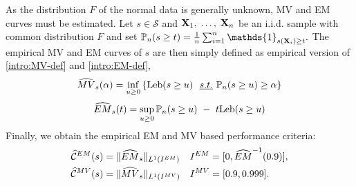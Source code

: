 As the distribution $F$ of the normal data is generally unknown, MV and EM curves must be estimated. Let $s\in \mathcal{S}$ and $\mathbf X_1,\; \ldots,\; \mathbf X_n$ be an i.i.d. sample with common distribution $F$ and set $\mathbb{P}_n(s \ge t)=\frac{1}{n}\sum_{i=1}^n\mathds{1}_{s(\mb X_i)\geq t}.$ The empirical MV and EM curves of $s$ are then simply defined as empirical version of \eqref{intro:MV-def} and \eqref{intro:EM-def}, 
\begin{align}
\label{MV-def-emp}
\widehat{MV}_s(\alpha) = \inf_{u \ge 0} \left\{ \text{Leb}(s \ge u) ~~\emph{s.t.}{}~ \mathbb{P}_n(s \ge u) \ge \alpha \right\}
\end{align}
\begin{align}
\label{EM-def-emp}
\widehat{EM}_s(t) = \sup_{u \ge 0} \mathbb{P}_n(s \ge u) ~-~ t \text{Leb}(s \ge u)
\end{align}
%
%
Finally, we obtain the empirical EM and MV based performance criteria:
\begin{align}
\label{eq:standard_emp_EM}\widehat{\mathcal{C}}^{EM}(s) &= \| \widehat{EM}_s \|_{L^1(I^{EM})}  &&I^{EM} = [0,\widehat{EM}^{-1}(0.9)],\\
\label{eq:standard_emp_MV}\widehat{\mathcal{C}}^{MV}(s) &= \| \widehat{MV}_s \|_{L^1(I^{MV})}  &&I^{MV} = [0.9, 0.999].
\end{align}
%

